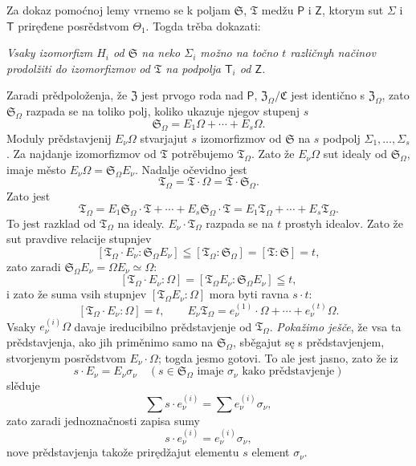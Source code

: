 \documentclass[11pt]{article}
\begin{document}
Za dokaz pomoćnoj lemy vrnemo se k poljam \(\mathfrak S\), \(\mathfrak T\) medžu \(\mathsf P\) i \(\mathsf Z\), ktorym sut \(\Sigma\) i \(\mathsf T\) priręđene posrědstvom \(\Theta_1\). Togda trěba dokazati:

\emph{Vsaky izomorfizm \(H_i\) od \(\mathfrak S\) na neko \(\Sigma_i\) možno na točno \(t\) različnyh načinov prodolžiti do izomorfizmov od \(\mathfrak T\) na podpolja \(\mathsf T_i\) od \(\mathsf Z\).}

Zaradi prědpoloženja, že \(\mathfrak Z\) jest prvogo roda nad \(\mathsf P\), \(\mathfrak Z_\Omega/\mathfrak C\) jest identično s \(\mathfrak Z_\Omega\), zato \(\mathfrak S_\Omega\) razpada se na toliko polj, koliko ukazuje njegov stupenj \(s\)
\[
\mathfrak S_\Omega = E_1\Omega+\cdots+E_s\Omega .
\]
Moduly prědstavjenij \(E_\nu\Omega\) stvarjajut \(s\) izomorfizmov od \(\mathfrak S\) na \(s\) podpolj \(\Sigma_1,\ldots,\Sigma_s\). Za najdanje izomorfizmov od \(\mathfrak T\) potrěbujemo \(\mathfrak T_\Omega\). Zato že \(E_\nu\Omega\) sut idealy od \(\mathfrak S_\Omega\), imaje město \(E_\nu\Omega=\mathfrak S_\Omega E_\nu\). Nadalje očevidno jest
\[
\mathfrak T_\Omega=\mathfrak T\cdot\Omega=\mathfrak T\cdot\mathfrak S_\Omega .
\]
Zato jest
\[
\mathfrak T_\Omega
=E_1\mathfrak S_\Omega\cdot\mathfrak T+\cdots+E_s\mathfrak S_\Omega\cdot\mathfrak T
=E_1\mathfrak T_\Omega+\cdots+E_s\mathfrak T_\Omega .
\]
To jest razklad od \(\mathfrak T_\Omega\) na idealy. \(E_\nu\cdot\mathfrak T_\Omega\) razpada se na \(t\) prostyh idealov. Zato že sut pravdive relacije stupnjev
\[
[\mathfrak T_\Omega\cdot E_\nu:\mathfrak S_\Omega E_\nu]
\leqq [\mathfrak T_\Omega:\mathfrak S_\Omega]=[\mathfrak T:\mathfrak S]=t,
\]
zato zaradi \(\mathfrak S_\Omega E_\nu=\Omega E_\nu\simeq\Omega\):
\[
[\mathfrak T_\Omega\cdot E_\nu:\Omega]
=[\mathfrak T_\Omega E_\nu:\mathfrak S_\Omega E_\nu]\leqq t,
\]
i zato že suma vsih stupnjev \([\mathfrak T_\Omega E_\nu:\Omega]\) mora byti ravna \(s\cdot t\):
\[
[\mathfrak T_\Omega\cdot E_\nu:\Omega]=t,\qquad
E_\nu\mathfrak T_\Omega=e_\nu^{(1)}\cdot\Omega+\cdots+e_\nu^{(t)}\Omega .
\]
Vsaky \(e_\nu^{(i)}\Omega\) davaje ireducibilno prědstavjenje od \(\mathfrak T_\Omega\). \emph{Pokažimo ješče}, že vsa ta prědstavjenja, ako jih priměnimo samo na \(\mathfrak S_\Omega\), sběgajut sę s prědstavjenjem, stvorjenym posrědstvom \(E_\nu\cdot\Omega\); togda jesmo gotovi. To ale jest jasno, zato že iz
\[
s\cdot E_\nu=E_\nu\sigma_\nu\quad
(s\in\mathfrak S_\Omega\text{ imaje }\sigma_\nu\text{ kako prědstavjenje})
\]
slěduje
\[
\sum s\cdot e_\nu^{(i)}=\sum e_\nu^{(i)}\sigma_\nu,
\]
zato zaradi jednoznačnosti zapisa sumy
\[
s\cdot e_\nu^{(i)}=e_\nu^{(i)}\sigma_\nu,
\]
nove prědstavjenja takože prirędžajut elementu \(s\) element \(\sigma_\nu\).
\end{document}
